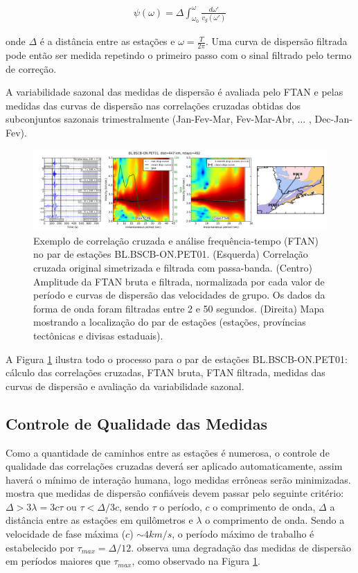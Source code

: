\begin{eqnarray}
\psi(\omega) = \Delta \int_{\omega_{0}}^{\omega} \frac{{d\omega}'}{v_{g}({\omega}')}
\end{eqnarray}

onde $\Delta$ é a distância entre as estações e $\omega = \frac{T}{2\pi}$. Uma curva de dispersão filtrada pode então ser medida repetindo o primeiro passo com o sinal filtrado pelo termo de correção.

A variabilidade sazonal das medidas de dispersão é avaliada pelo FTAN e pelas medidas das curvas de dispersão nas correlações cruzadas obtidas dos subconjuntos sazonais trimestralmente (Jan-Fev-Mar, Fev-Mar-Abr, ... , Dec-Jan-Fev). 

\begin{figure}[!ht]
\centering
\includegraphics[scale=0.3]{Figs/correlacao_FTAN.png}
\caption[Exemplo de correlação cruzada e análise frequência-tempo (FTAN) no par de estações BL.BSCB-ON.PET01.]{Exemplo de correlação cruzada e análise frequência-tempo (FTAN) no par de estações BL.BSCB-ON.PET01. (Esquerda) Correlação cruzada original simetrizada e filtrada com passa-banda. (Centro) Amplitude da FTAN bruta e filtrada, normalizada por cada valor de período e curvas de dispersão das velocidades de grupo. Os dados da forma de onda foram filtradas entre 2 e 50 segundos. (Direita) Mapa mostrando a localização do par de estações (estações, províncias tectônicas e divisas estaduais).}
\label{correlacao_FTAN}
\end{figure}

A Figura \ref{correlacao_FTAN} ilustra todo o processo para o par de estações BL.BSCB-ON.PET01: cálculo das correlações cruzadas, FTAN bruta, FTAN filtrada, medidas das curvas de dispersão e avaliação da variabilidade sazonal. 

\subsection{Controle de Qualidade das Medidas}

Como a quantidade de caminhos entre as estações é numerosa, o controle de qualidade das correlações cruzadas deverá ser aplicado automaticamente, assim haverá o mínimo de interação humana, logo medidas errôneas serão minimizadas. \cite{bensen_processing_2007} mostra que medidas de dispersão confiáveis devem passar pelo seguinte critério: $\Delta > 3\lambda = 3c\tau$ ou $\tau < \Delta/3c$, sendo $\tau$ o período, $c$ o comprimento de onda, $\Delta$ a distância entre as estações em quilômetros e $\lambda$ o comprimento de onda. Sendo a velocidade de fase máxima ($c$) $\sim 4 km/s$, o período máximo de trabalho é estabelecido por $\tau_{max} = \Delta/12$. \cite{bensen_processing_2007} observa uma degradação das medidas de dispersão em períodos maiores que $\tau_{max}$, como observado na Figura \ref{correlacao_FTAN}. 

